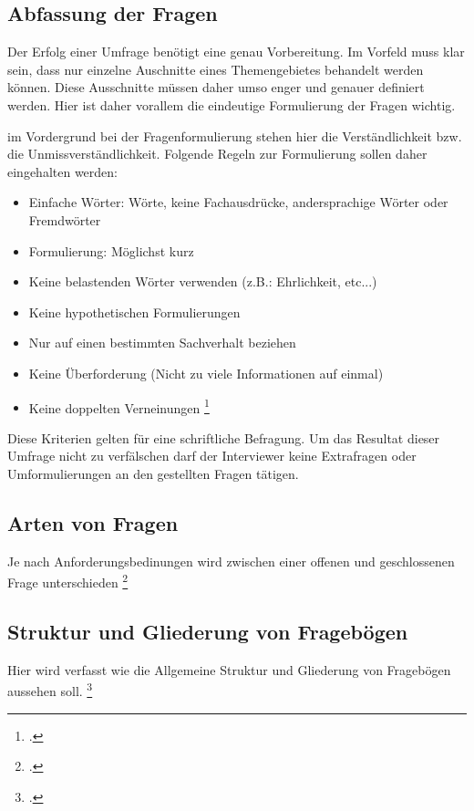\subsection{Abfassung der Fragen}
Der Erfolg einer Umfrage benötigt eine genau Vorbereitung. Im Vorfeld muss klar sein,
dass nur einzelne Auschnitte eines Themengebietes behandelt werden können. Diese Ausschnitte
müssen daher umso enger und genauer definiert werden. Hier ist daher vorallem die eindeutige
Formulierung der Fragen wichtig.

im Vordergrund bei der Fragenformulierung stehen hier die Verständlichkeit bzw. die Unmissverständlichkeit.
Folgende Regeln zur Formulierung sollen daher eingehalten werden:
\begin{itemize}
    \item Einfache Wörter: Wörte, keine Fachausdrücke, andersprachige Wörter oder Fremdwörter
    \item Formulierung: Möglichst kurz
    \item Keine belastenden Wörter verwenden (z.B.: Ehrlichkeit, etc...)
    \item Keine hypothetischen Formulierungen
    \item Nur auf einen bestimmten Sachverhalt beziehen
    \item Keine Überforderung (Nicht zu viele Informationen auf einmal)
    \item Keine doppelten Verneinungen \footcite{Interview und schriftliche Befragung}
\end{itemize}

Diese Kriterien gelten für eine schriftliche Befragung. Um das Resultat dieser Umfrage nicht
zu verfälschen darf der Interviewer keine Extrafragen oder Umformulierungen an den gestellten
Fragen tätigen.

\subsection{Arten von Fragen}
Je nach Anforderungsbedinungen wird zwischen einer offenen und geschlossenen Frage unterschieden \footcite{Interview und schriftliche Befragung}


\subsection{Struktur und Gliederung von Fragebögen}
Hier wird verfasst wie die Allgemeine Struktur und Gliederung von Fragebögen aussehen soll. \footcite{Einfuehrung in die Test- und Fragebogenkonstruktion}

